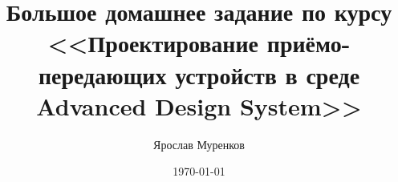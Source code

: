 \documentclass[a4paper,12pt]{report}
\author{Ярослав Муренков}
\title{Большое домашнее задание по курсу <<Проектирование приёмо-передающих устройств в среде Advanced Design System>>}
\date{\today}
\begin{document}

\tableofcontents{}





\end{document}
